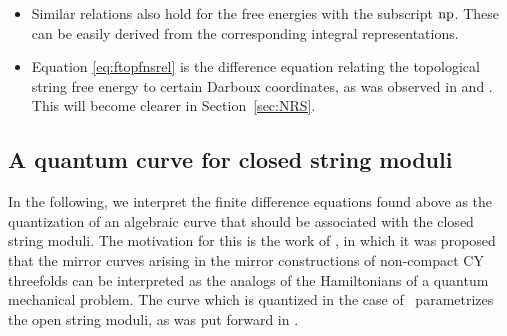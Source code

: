 \documentclass[pdftex]{sigma}
\numberwithin{equation}{section}
\begin{document}
\begin{Remark}\quad
\begin{itemize}
 \item Similar relations also hold for the free energies with the subscript ${\rm np}$. These can be easily derived from the corresponding integral representations.
 \item Equation \eqref{eq:ftopfnsrel} is the difference equation relating the topological string free energy to certain Darboux coordinates, as was observed in \cite{CLT20} and \cite{AST21}. This will become clearer in Section~\ref{sec:NRS}.
\end{itemize}
\end{Remark}


\subsection{A quantum curve for closed string moduli}\label{sec:qcclosedm}

In the following, we interpret the finite difference equations found above as the quantization of an algebraic curve that should be associated with the closed string moduli. The motivation for this is the work of \cite{ADKMV}, in which it was proposed that the mirror curves arising in the mirror constructions of non-compact CY threefolds can be interpreted as the analogs of the Hamiltonians of a quantum mechanical problem. The curve which is quantized in the case of~\cite{ADKMV} parametrizes the open string moduli, as was put forward in \cite{Aganagic:2000gs}.
\end{document}
